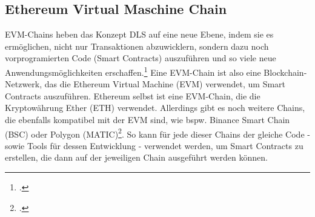 \subsection{Ethereum Virtual Maschine Chain}
\label{sec:definition-evm-chain}
EVM-Chains heben das Konzept DLS auf eine neue Ebene, indem sie es ermöglichen, nicht nur Transaktionen abzuwicklern, sondern dazu noch vorprogramierten Code (Smart Contracts) auszuführen und so viele neue Anwendungsmöglichkeiten erschaffen.\footcite[Vgl. hierzu und im Folgenden][]{w5}
Eine EVM-Chain ist also eine Blockchain-Netzwerk, das die Ethereum Virtual Machine (EVM) verwendet, um Smart Contracts auszuführen.
Ethereum selbst ist eine EVM-Chain, die die Kryptowährung Ether (ETH) verwendet. Allerdings gibt es noch weitere Chains, die ebenfalls kompatibel mit der EVM sind, wie bspw. Binance Smart Chain (BSC) oder Polygon (MATIC)\footcite[Vgl.][]{w6}.
So kann für jede dieser Chains der gleiche Code - sowie Tools für dessen Entwicklung - verwendet werden, um Smart Contracts zu erstellen, die dann auf der jeweiligen Chain ausgeführt werden können.